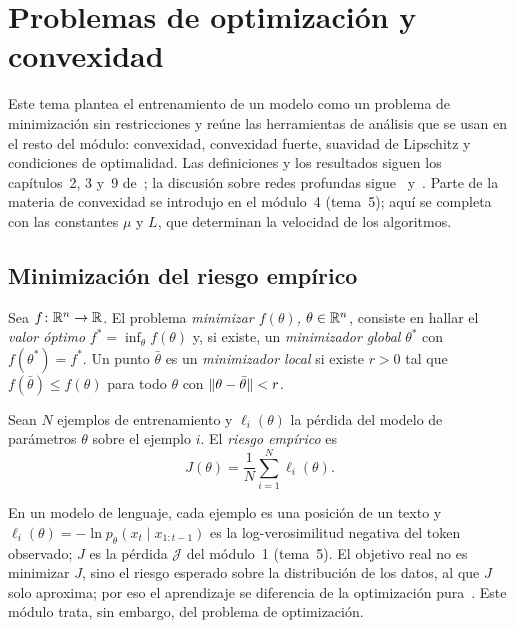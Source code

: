 \chapter{Problemas de optimización y convexidad}
\label{tema:1}

Este tema plantea el entrenamiento de un modelo como un problema de minimización sin restricciones y reúne las herramientas de análisis que se usan en el resto del módulo: convexidad, convexidad fuerte, suavidad de Lipschitz y condiciones de optimalidad. Las definiciones y los resultados siguen los capítulos~2, 3 y~9 de~\cite{bv}; la discusión sobre redes profundas sigue~\cite[§8.1 y §8.2]{gbc} y~\cite[§12.1 y §12.2]{d2l}. Parte de la materia de convexidad se introdujo en el módulo~4 (tema~5); aquí se completa con las constantes $\mu$ y $L$, que determinan la velocidad de los algoritmos.

\section{Minimización del riesgo empírico}

\begin{definicion}
Sea $f\colon\mathbb{R}^{n}\to\mathbb{R}$. El problema \emph{minimizar $f(\theta)$, $\theta\in\mathbb{R}^{n}$}, consiste en hallar el \emph{valor óptimo} $f^{\ast}=\inf_{\theta}f(\theta)$ y, si existe, un \emph{minimizador global} $\theta^{\ast}$ con $f(\theta^{\ast})=f^{\ast}$. Un punto $\bar\theta$ es un \emph{minimizador local} si existe $r>0$ tal que $f(\bar\theta)\le f(\theta)$ para todo $\theta$ con $\lVert\theta-\bar\theta\rVert<r$.
\end{definicion}

\begin{definicion}\label{def:riesgo}
Sean $N$ ejemplos de entrenamiento y $\ell_i(\theta)$ la pérdida del modelo de parámetros $\theta$ sobre el ejemplo $i$. El \emph{riesgo empírico} es
\[
J(\theta)=\frac1N\sum_{i=1}^{N}\ell_i(\theta).
\]
\end{definicion}

En un modelo de lenguaje, cada ejemplo es una posición de un texto y $\ell_i(\theta)=-\ln p_\theta(x_t\mid x_{1:t-1})$ es la log-verosimilitud negativa del token observado; $J$ es la pérdida $\mathcal{J}$ del módulo~1 (tema~5). El objetivo real no es minimizar $J$, sino el riesgo esperado sobre la distribución de los datos, al que $J$ solo aproxima; por eso el aprendizaje se diferencia de la optimización pura~\cite[§8.1]{gbc}. Este módulo trata, sin embargo, del problema de optimización.

